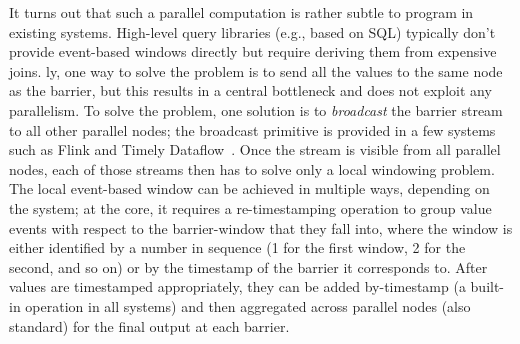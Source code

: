It turns out that such a parallel computation is rather subtle to program in existing systems. High-level query libraries (e.g., based on SQL) typically don't provide event-based windows directly but require deriving them from expensive joins.
\Naive{}ly, one way to solve the problem is to send all the values to the same node as the barrier, but this results in a central bottleneck and does not exploit any parallelism.
To solve the problem, one solution is to \emph{broadcast} the barrier stream to all other parallel nodes; the broadcast primitive is provided in a few systems such as Flink and Timely Dataflow~\cite{BroadcastStateFlink,BroadcastStateTimely}.
Once the stream is visible from all parallel nodes, each of those streams then has to solve only a local windowing problem.
The local event-based window can be achieved in multiple ways, depending on the system; at the core, it requires a re-timestamping operation to
group value events with respect to the barrier-window that they fall into,
where the window is either identified by a number in sequence (1 for the first window, 2 for the second, and so on) or by the timestamp of the barrier it corresponds to.
After values are timestamped appropriately, they can be added by-timestamp (a built-in operation in all systems) and then aggregated across parallel nodes (also standard) for the final output at each barrier.

